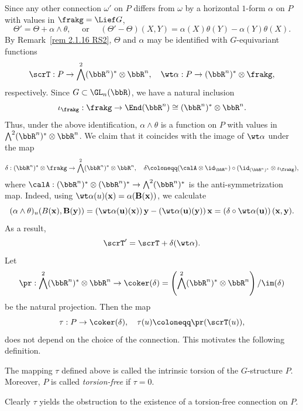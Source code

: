 Since any other connection $\omega'$ on $P$ differs from $\omega$ by a horizontal $1$-form $\alpha$ on $P$ with values in $\frakg=\Lief G$,
\[\Theta'=\Theta+\alpha\wedge\theta,\quad\text{ or }\quad (\Theta'-\Theta)(X,Y)=\alpha(X)\theta(Y)-\alpha(Y)\theta(X).\]
By Remark~\ref{rem 2.1.16 RS2}, $\Theta$ and $\alpha$ may be identified with $G$-equivariant functions 
\[\scrT:P\to \bigwedge^2(\bbR^n)^\ast\otimes\bbR^n,\quad \wt\alpha:P\to (\bbR^n)^\ast\otimes\frakg,\]
respectively. Since $G\subset\GL_n(\bbR)$, we have a natural inclusion 
\[\iota_\frakg:\frakg\to \End(\bbR^n)\cong (\bbR^n)^\ast\otimes\bbR^n.\]
Thus, under the above identification, $\alpha\wedge\theta$ is a function on $P$ with values in $\bigwedge^2(\bbR^n)^\ast\otimes\bbR^n$. We claim that it coincides with the image of $\wt\alpha$ under the map 
\[\delta:(\bbR^n)^\ast\otimes\frakg\to \bigwedge^2(\bbR^n)^\ast\otimes\bbR^n,\quad \delta\coloneqq (\calA\otimes\id_{\bbR^n})\circ(\id_{(\bbR^n)^\ast}\otimes \iota_\frakg),\]
where $\calA:(\bbR^n)^\ast\otimes (\bbR^n)^\ast\to \bigwedge^2(\bbR^n)^\ast$ is the anti-symmetrization map. Indeed, using $\wt\alpha(u)(\bf{x})=\alpha(B(\bf{x}))$, we calculate 
\[(\alpha\wedge\theta)_u(B(\bf{x}),B(\bf{y}))=\left(\wt\alpha(u)(\bf{x})\right)\bf{y}-\left(\wt\alpha(u)(\bf{y})\right)\bf{x}=\left(\delta\circ\wt\alpha(u)\right)(\bf{x},\bf{y}).\]
As a result,
\[\scrT'=\scrT+\delta(\wt\alpha).\label{eq 2.2.3 RS2}\]
Let 
\[\pr :\bigwedge^2(\bbR^n)^\ast\otimes\bbR^n\to \coker(\delta)=\left(\bigwedge^2(\bbR^n)^\ast\otimes\bbR^n\right)\slash\im(\delta)\]
be the natural projection. Then the map 
\[\tau:P\to \coker(\delta),\quad \tau(u)\coloneqq \pr(\scrT(u)),\]
does not depend on the choice of the connection. This motivates the following definition.

\begin{defn}
    The mapping $\tau$ defined above is called the intrinsic torsion of the $G$-structure $P$. Moreover, $P$ is called \emph{torsion-free} if $\tau=0$.
\end{defn}

Clearly $\tau$ yields the obstruction to the existence of a torsion-free connection on $P$.


